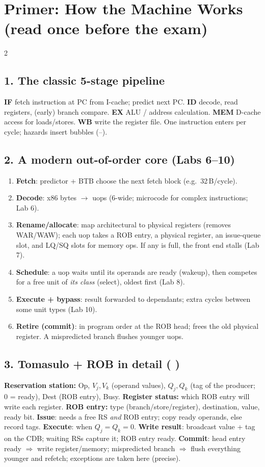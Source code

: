 \section{Primer: How the Machine Works (read once before the exam)}\label{sec:primer}
\begin{multicols}{2}
\subsection*{1. The classic 5-stage pipeline}
\textbf{IF} fetch instruction at PC from I-cache; predict next PC. \textbf{ID} decode, read registers, (early) branch compare. \textbf{EX} ALU / address calculation. \textbf{MEM} D-cache access for loads/stores. \textbf{WB} write the register file. One instruction enters per cycle; hazards insert bubbles (--).

\subsection*{2. A modern out-of-order core (Labs 6--10)}
\begin{enumerate}[label=\arabic*.]
\item \textbf{Fetch}: predictor + BTB choose the next fetch block (e.g.\ 32\,B/cycle).
\item \textbf{Decode}: x86 bytes $\rightarrow$ uops (6-wide; microcode for complex instructions; Lab 6).
\item \textbf{Rename/allocate}: map architectural to physical registers (removes WAR/WAW); each uop takes a ROB entry, a physical register, an issue-queue slot, and LQ/SQ slots for memory ops. If any is full, the front end stalls (Lab 7).
\item \textbf{Schedule}: a uop waits until its operands are ready (wakeup), then competes for a free unit of \emph{its class} (select), oldest first (Lab 8).
\item \textbf{Execute + bypass}: result forwarded to dependants; extra cycles between some unit types (Lab 10).
\item \textbf{Retire (commit)}: in program order at the ROB head; frees the old physical register. A mispredicted branch flushes younger uops.
\end{enumerate}

\subsection*{3. Tomasulo + ROB in detail ( )}
\textbf{Reservation station:} Op, $V_j,V_k$ (operand values), $Q_j,Q_k$ (tag of the producer; 0 = ready), Dest (ROB entry), Busy. \textbf{Register status:} which ROB entry will write each register. \textbf{ROB entry:} type (branch/store/register), destination, value, ready bit.
\textbf{Issue}: needs a free RS \emph{and} ROB entry; copy ready operands, else record tags. \textbf{Execute}: when $Q_j=Q_k=0$. \textbf{Write result}: broadcast value + tag on the CDB; waiting RSs capture it; ROB entry ready. \textbf{Commit}: head entry ready $\Rightarrow$ write register/memory; mispredicted branch $\Rightarrow$ flush everything younger and refetch; exceptions are taken here (precise).


\end{multicols}
